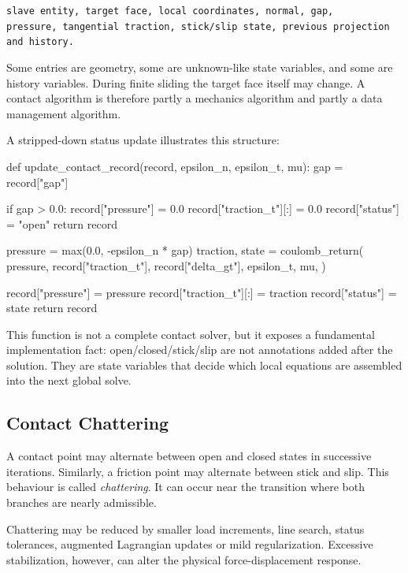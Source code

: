 \begin{center}
\texttt{slave entity, target face, local coordinates, normal, gap, pressure,}\
\texttt{tangential traction, stick/slip state, previous projection and history.}
\end{center}

Some entries are geometry, some are unknown-like state variables, and some are
history variables. During finite sliding the target face itself may change. A
contact algorithm is therefore partly a mechanics algorithm and partly a data
management algorithm.

A stripped-down status update illustrates this structure:

\begin{python}
def update_contact_record(record, epsilon_n, epsilon_t, mu):
    gap = record["gap"]

    if gap > 0.0:
        record["pressure"] = 0.0
        record["traction_t"][:] = 0.0
        record["status"] = "open"
        return record

    pressure = max(0.0, -epsilon_n * gap)
    traction, state = coulomb_return(
        pressure,
        record["traction_t"],
        record["delta_gt"],
        epsilon_t,
        mu,
    )

    record["pressure"] = pressure
    record["traction_t"][:] = traction
    record["status"] = state
    return record
\end{python}

This function is not a complete contact solver, but it exposes a fundamental
implementation fact: open/closed/stick/slip are not annotations added after the
solution. They are state variables that decide which local equations are
assembled into the next global solve.

\subsection{Contact Chattering}

A contact point may alternate between open and closed states in successive
iterations. Similarly, a friction point may alternate between stick and slip.
This behaviour is called \textit{chattering}. It can occur near the transition
where both branches are nearly admissible.

Chattering may be reduced by smaller load increments, line search, status
tolerances, augmented Lagrangian updates or mild regularization. Excessive
stabilization, however, can alter the physical force-displacement response.

